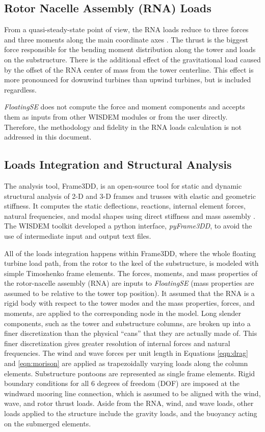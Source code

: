 \subsection{Rotor Nacelle Assembly (RNA) Loads}
From a quasi-steady-state point of view, the RNA loads reduce to three
forces and three moments along the main coordinate axes
\citet{JacketSE}. The thrust is the biggest force responsible for the
bending moment distribution along the tower and loads on the
substructure.  There is the additional effect of the gravitational load
caused by the offset of the RNA center of mass from the tower
centerline.  This effect is more pronounced for downwind turbines than
upwind turbines, but is included regardless.

\textit{FloatingSE} does not compute the force and moment components and
accepts them as inputs from other WISDEM modules or from the user
directly.  Therefore, the methodology and fidelity in the RNA loads
calculation is not addressed in this document.


\subsection{Loads Integration and Structural Analysis}
The analysis tool, Frame3DD, is an open-source tool for static and
dynamic structural analysis of 2-D and 3-D frames and trusses with
elastic and geometric stiffness. It computes the static deflections,
reactions, internal element forces, natural frequencies, and modal
shapes using direct stiffness and mass assembly \citep{frame3dd}.  The
WISDEM toolkit developed a python interface, \textit{pyFrame3DD}, to avoid the
use of intermediate input and output text files.

All of the loads integration happens within Frame3DD, where the whole
floating turbine load path, from the rotor to the keel of the
substructure, is modeled with simple Timoshenko frame elements.  The
forces, moments, and mass properties of the rotor-nacelle assembly (RNA)
are inputs to \textit{FloatingSE} (mass properties are assumed to be
relative to the tower top position).  It assumed that the RNA is a rigid
body with respect to the tower modes and the mass properties, forces,
and moments, are applied to the corresponding node in the model.  Long
slender components, such as the tower and substructure columns, are
broken up into a finer discretization than the physical ``cans'' that
they are actually made of.  This finer discretization gives greater
resolution of internal forces and natural frequencies.  The wind and
wave forces per unit length in Equations \ref{eqn:drag} and
\ref{eqn:morison} are applied as trapezoidally varying loads along the
column elements.  Substructure pontoons are represented as single frame
elements.  Rigid boundary conditions for all 6 degrees of freedom (DOF)
are imposed at the windward mooring line connection, which is assumed to
be aligned with the wind, wave, and rotor thrust loads.  Aside from the
RNA, wind, and wave loads, other loads applied to the structure include
the gravity loads, and the buoyancy acting on the submerged elements.

